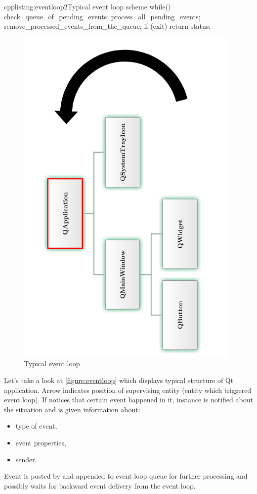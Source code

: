 \begin{fdoccode}{cpp}{listing:eventloop2}{Typical event loop scheme}
while() {
	check_queue_of_pending_events;
	process_all_pending_events;
	remove_processed_events_from_the_queue;
	if (exit) {
		return status;
	}
}
\end{fdoccode}

\begin{figure}[ht]
\centering
\includegraphics[angle=-90,width=11cm]{graphics/laboratory/15-eventloop.pdf}
\caption{Typical event loop}\label{figure:eventloop}
\end{figure}

Let's take a look at \autoref{figure:eventloop} which displays typical structure of Qt application.  Arrow indicates position of supervising entity (entity which triggered event loop). If notices that certain event happened in it, instance is notified about the situation and is given information about:
\begin{itemize}
\item type of event,
\item event properties,
\item sender.
\end{itemize}
Event is posted by and appended to event loop queue for further processing and possibly waits for backward event delivery from the event loop.

